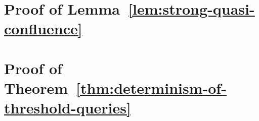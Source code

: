 \section{Proof of Lemma~\ref{lem:strong-quasi-confluence}}\label{section:strong-quasi-confluence-proof}


\section{Proof of Theorem~\ref{thm:determinism-of-threshold-queries}}\label{section:determinism-of-threshold-queries-proof}


